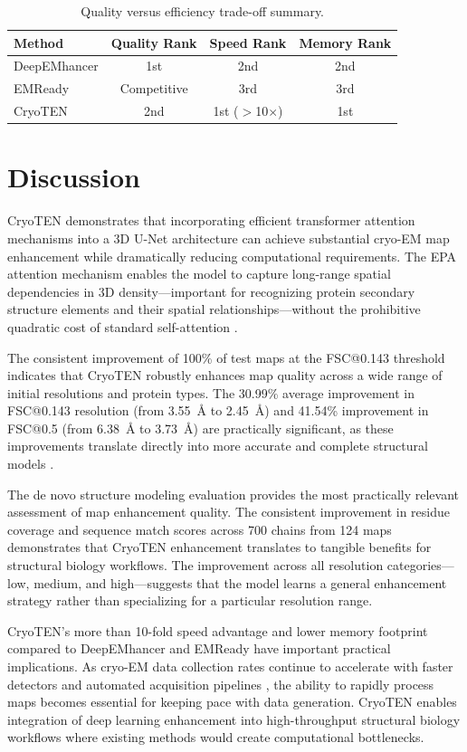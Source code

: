 \documentclass[11pt]{article}
\begin{document}
\begin{table}[H]
\centering
\caption{Quality versus efficiency trade-off summary.}
\label{tab:tradeoff}
\begin{tabular}{lccc}
\toprule
Method & Quality Rank & Speed Rank & Memory Rank \\
\midrule
DeepEMhancer & 1st & 2nd & 2nd \\
EMReady & Competitive & 3rd & 3rd \\
CryoTEN & 2nd & 1st ($>$10$\times$) & 1st \\
\bottomrule
\end{tabular}
\end{table}

\section{Discussion}

CryoTEN demonstrates that incorporating efficient transformer attention mechanisms into a 3D U-Net architecture can achieve substantial cryo-EM map enhancement while dramatically reducing computational requirements. The EPA attention mechanism enables the model to capture long-range spatial dependencies in 3D density---important for recognizing protein secondary structure elements and their spatial relationships---without the prohibitive quadratic cost of standard self-attention \citep{Vaswani2017,Shaker2022}.

The consistent improvement of 100\% of test maps at the FSC@0.143 threshold indicates that CryoTEN robustly enhances map quality across a wide range of initial resolutions and protein types. The 30.99\% average improvement in FSC@0.143 resolution (from 3.55~\AA{} to 2.45~\AA{}) and 41.54\% improvement in FSC@0.5 (from 6.38~\AA{} to 3.73~\AA{}) are practically significant, as these improvements translate directly into more accurate and complete structural models \citep{Lawson2021,Pintilie2020}.

The de novo structure modeling evaluation provides the most practically relevant assessment of map enhancement quality. The consistent improvement in residue coverage and sequence match scores across 700 chains from 124 maps demonstrates that CryoTEN enhancement translates to tangible benefits for structural biology workflows. The improvement across all resolution categories---low, medium, and high---suggests that the model learns a general enhancement strategy rather than specializing for a particular resolution range.

CryoTEN's more than 10-fold speed advantage and lower memory footprint compared to DeepEMhancer and EMReady \citep{SanchezGarcia2021,He2023} have important practical implications. As cryo-EM data collection rates continue to accelerate with faster detectors and automated acquisition pipelines \citep{Cheng2018,Nakane2020}, the ability to rapidly process maps becomes essential for keeping pace with data generation. CryoTEN enables integration of deep learning enhancement into high-throughput structural biology workflows where existing methods would create computational bottlenecks.
\end{document}
